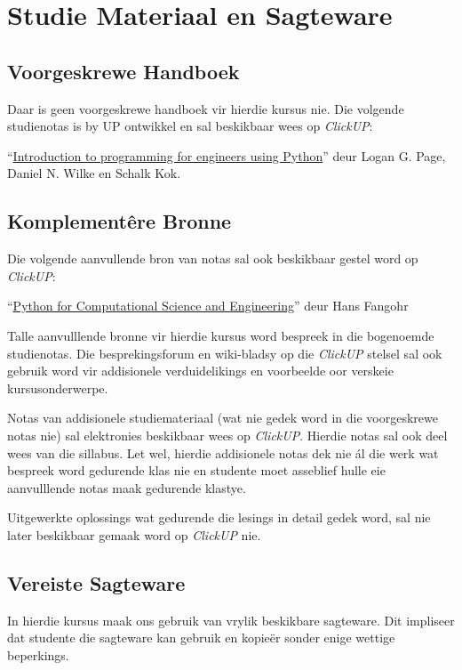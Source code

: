\section{Studie Materiaal en Sagteware}
    \subsection{Voorgeskrewe Handboek}
        Daar is geen voorgeskrewe handboek vir hierdie kursus nie. Die volgende
        studienotas is by UP ontwikkel en sal beskikbaar wees op
        \textit{ClickUP}:

        ``\underline{Introduction to programming for engineers using Python}''
        deur Logan G. Page, Daniel N. Wilke en Schalk Kok.

    \subsection{Komplement\^{e}re Bronne}
        Die volgende aanvullende bron van notas sal ook beskikbaar gestel word
        op \textit{ClickUP}:

        ``\underline{Python for Computational Science and Engineering}'' deur
        Hans Fangohr

        Talle aanvulllende bronne vir hierdie kursus word bespreek in die
        bogenoemde studienotas.  Die besprekingsforum en wiki-bladsy op die
        \textit{ClickUP} stelsel sal ook gebruik word vir addisionele
        verduidelikings en voorbeelde oor verskeie kursusonderwerpe.

        Notas van addisionele studiemateriaal (wat nie gedek word in die
        voorgeskrewe notas nie) sal elektronies beskikbaar wees op
        \textit{ClickUP}. Hierdie notas sal ook deel wees van die sillabus.
        Let wel, hierdie addisionele notas dek nie \'{a}l die werk wat bespreek
        word gedurende klas nie en studente moet asseblief hulle eie
        aanvulllende notas maak gedurende klastye.

        Uitgewerkte oplossings wat gedurende die lesings in detail gedek word,
        sal nie later beskikbaar gemaak word op \textit{ClickUP} nie.

    \subsection{Vereiste Sagteware}
        In hierdie kursus maak ons gebruik van vrylik beskikbare sagteware.
        Dit impliseer dat studente die sagteware kan gebruik en kopie\"er
        sonder enige wettige beperkings.


